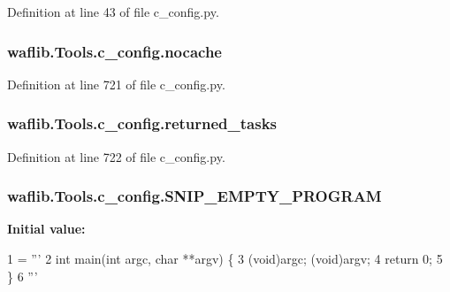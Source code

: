 Definition at line 43 of file c\+\_\+config.\+py.

\subsubsection[{\texorpdfstring{nocache}{nocache}}]{\setlength{\rightskip}{0pt plus 5cm}waflib.\+Tools.\+c\+\_\+config.\+nocache}\hypertarget{namespacewaflib_1_1_tools_1_1c__config_a73e9576f8883957dafdb1b992e3498b6}{}\label{namespacewaflib_1_1_tools_1_1c__config_a73e9576f8883957dafdb1b992e3498b6}


Definition at line 721 of file c\+\_\+config.\+py.

\subsubsection[{\texorpdfstring{returned\+\_\+tasks}{returned_tasks}}]{\setlength{\rightskip}{0pt plus 5cm}waflib.\+Tools.\+c\+\_\+config.\+returned\+\_\+tasks}\hypertarget{namespacewaflib_1_1_tools_1_1c__config_a0b2cb53eb0c01eb09f71eb66d7249373}{}\label{namespacewaflib_1_1_tools_1_1c__config_a0b2cb53eb0c01eb09f71eb66d7249373}


Definition at line 722 of file c\+\_\+config.\+py.

\subsubsection[{\texorpdfstring{S\+N\+I\+P\+\_\+\+E\+M\+P\+T\+Y\+\_\+\+P\+R\+O\+G\+R\+AM}{SNIP_EMPTY_PROGRAM}}]{ waflib.\+Tools.\+c\+\_\+config.\+S\+N\+I\+P\+\_\+\+E\+M\+P\+T\+Y\+\_\+\+P\+R\+O\+G\+R\+AM}\hypertarget{namespacewaflib_1_1_tools_1_1c__config_af47bf63341f9323a7713ac4d2539fdb7}{}\label{namespacewaflib_1_1_tools_1_1c__config_af47bf63341f9323a7713ac4d2539fdb7}
{\bfseries Initial value\+:}
\begin{DoxyCode}
1 = \textcolor{stringliteral}{'''}
2 \textcolor{stringliteral}{int main(int argc, char **argv) \{}
3 \textcolor{stringliteral}{    (void)argc; (void)argv;}
4 \textcolor{stringliteral}{    return 0;}
5 \textcolor{stringliteral}{\}}
6 \textcolor{stringliteral}{'''}
\end{DoxyCode}


